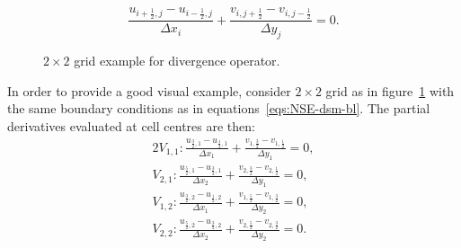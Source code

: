 \documentclass{article}
\begin{document}
\begin{equation}
  \frac{u_{i+\frac{1}{2},j} - u_{i-\frac{1}{2},j}}{\Delta x_i}+  \frac{v_{i,j+\frac{1}{2}} - v_{i,j-\frac{1}{2}}}{\Delta y_j}=0.
\end{equation}


\begin{figure}[H] %
  \caption{$2\times 2$ grid example for divergence operator.}\label{fig:D-example-2x2}
\end{figure}

In order to provide a good visual example, consider $2 \times 2$ grid as in figure~\ref{fig:D-example-2x2} with the same boundary conditions as in equations~\eqref{eqs:NSE-dsm-bl}. The partial derivatives evaluated at cell centres are then: 
\begin{alignat*}{2}
	V_{1,1}:\frac{u_{\frac{3}{2},1} - u_{\frac{1}{2},1}}{\Delta x_1}+\frac{v_{1,\frac{3}{2}} - v_{1,\frac{1}{2}}}{\Delta y_1}=0,\\
	V_{2,1}: \frac{u_{\frac{5}{2},1} - u_{\frac{3}{2},1}}{\Delta x_2}+\frac{v_{2,\frac{3}{2}} - v_{2,\frac{1}{2}}}{\Delta y_1}=0,\\
	V_{1,2}:\frac{u_{\frac{3}{2},2} - u_{\frac{1}{2},2}}{\Delta x_1}+\frac{v_{1,\frac{5}{2}} - v_{1,\frac{3}{2}}}{\Delta y_2}=0,\\
	V_{2,2}:\frac{u_{\frac{5}{2},2} - u_{\frac{3}{2},2}}{\Delta x_2}+\frac{v_{2,\frac{5}{2}} - v_{2,\frac{3}{2}}}{\Delta y_2}=0.
\end{alignat*}
\end{document}
